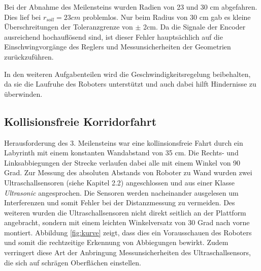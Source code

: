\documentclass[12pt,a4paper,oneside]{article}
\begin{document}
\begin{spacing}{1.15}
\newpage
Bei der Abnahme des Meilensteins wurden Radien von 23 und 30 cm abgefahren. Dies lief bei $r_{soll} = 23 cm$ problemlos. Nur beim Radius von 30 cm gab es kleine Überschreitungen der Toleranzgrenze von $\pm$ 2cm. Da die Signale der Encoder ausreichend hochauflösend sind, ist dieser Fehler hauptsächlich auf die Einschwingvorgänge des Reglers und Messunsicherheiten der Geometrien zurückzuführen. 

In den weiteren Aufgabenteilen wird die Geschwindigkeitsregelung beibehalten, da sie die Laufruhe des Roboters unterstützt und auch dabei hilft Hindernisse zu überwinden.




	
\subsection{Kollisionsfreie Korridorfahrt}

Herausforderung des 3. Meilensteins war eine kollinsionsfreie Fahrt durch ein Labyrinth mit einem konstanten Wandabstand von 35 cm. Die Rechts- und Linksabbiegungen der Strecke verlaufen dabei alle mit einem Winkel von 90 Grad. Zur Messung des absoluten Abstands von Roboter zu Wand wurden zwei Ultraschallsensoren (siehe Kapitel 2.2) angeschlossen und aus einer Klasse \textit{Ultrasonic} angesprochen. Die Sensoren werden nacheinander ausgelesen um Interferenzen und somit Fehler bei der Distanzmessung zu vermeiden. Des weiteren wurden die Ultraschallsensoren nicht direkt seitlich an der Plattform angebracht, sondern mit einem leichten Winkelversatz von 30 Grad nach vorne montiert. Abbildung \ref{fig:kurve} zeigt, dass dies ein Vorausschauen des Roboters und somit die rechtzeitige Erkennung von Abbiegungen bewirkt. Zudem verringert diese Art der Anbringung Messunsicherheiten des Ultraschallsensors, die sich auf schrägen Oberflächen einstellen.


\end{spacing}
\end{document}
